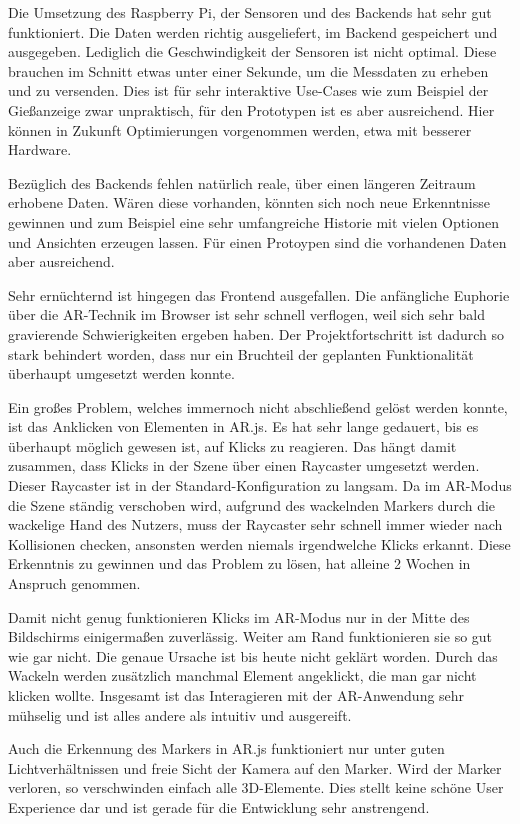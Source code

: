 Die Umsetzung des Raspberry Pi, der Sensoren und des Backends hat sehr
gut funktioniert. Die Daten werden richtig ausgeliefert, im Backend
gespeichert und ausgegeben. Lediglich die Geschwindigkeit der Sensoren
ist nicht optimal. Diese brauchen im Schnitt etwas unter einer Sekunde,
um die Messdaten zu erheben und zu versenden. Dies ist für sehr
interaktive Use-Cases wie zum Beispiel der Gießanzeige zwar unpraktisch,
für den Prototypen ist es aber ausreichend. Hier können in Zukunft
Optimierungen vorgenommen werden, etwa mit besserer Hardware.

Bezüglich des Backends fehlen natürlich reale, über einen längeren
Zeitraum erhobene Daten. Wären diese vorhanden, könnten sich noch neue
Erkenntnisse gewinnen und zum Beispiel eine sehr umfangreiche Historie
mit vielen Optionen und Ansichten erzeugen lassen. Für einen Protoypen
sind die vorhandenen Daten aber ausreichend.

Sehr ernüchternd ist hingegen das Frontend ausgefallen. Die anfängliche
Euphorie über die AR-Technik im Browser ist sehr schnell verflogen, weil
sich sehr bald gravierende Schwierigkeiten ergeben haben. Der
Projektfortschritt ist dadurch so stark behindert worden, dass nur ein
Bruchteil der geplanten Funktionalität überhaupt umgesetzt werden
konnte.

Ein großes Problem, welches immernoch nicht abschließend gelöst werden
konnte, ist das Anklicken von Elementen in AR.js. Es hat sehr lange
gedauert, bis es überhaupt möglich gewesen ist, auf Klicks zu reagieren.
Das hängt damit zusammen, dass Klicks in der Szene über einen Raycaster
umgesetzt werden. Dieser Raycaster ist in der Standard-Konfiguration zu
langsam. Da im AR-Modus die Szene ständig verschoben wird, aufgrund des
wackelnden Markers durch die wackelige Hand des Nutzers, muss der
Raycaster sehr schnell immer wieder nach Kollisionen checken, ansonsten
werden niemals irgendwelche Klicks erkannt. Diese Erkenntnis zu gewinnen
und das Problem zu lösen, hat alleine 2 Wochen in Anspruch genommen.

Damit nicht genug funktionieren Klicks im AR-Modus nur in der Mitte des
Bildschirms einigermaßen zuverlässig. Weiter am Rand funktionieren sie
so gut wie gar nicht. Die genaue Ursache ist bis heute nicht geklärt
worden. Durch das Wackeln werden zusätzlich manchmal Element angeklickt,
die man gar nicht klicken wollte. Insgesamt ist das Interagieren mit der
AR-Anwendung sehr mühselig und ist alles andere als intuitiv und
ausgereift.

Auch die Erkennung des Markers in AR.js funktioniert nur unter guten
Lichtverhältnissen und freie Sicht der Kamera auf den Marker. Wird der
Marker verloren, so verschwinden einfach alle 3D-Elemente. Dies stellt
keine schöne User Experience dar und ist gerade für die Entwicklung sehr
anstrengend.


